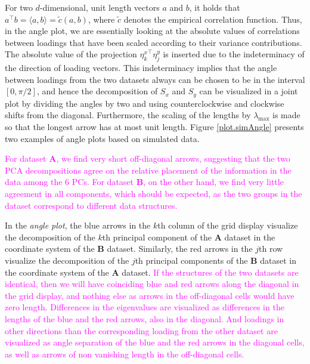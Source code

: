 \documentclass[a4paper,12pt]{article}
\newcommand{\hl}[1]{\textcolor{magenta}{#1}}
\begin{document}
For two $d$-dimensional, unit length vectors $a$ and $b$, it holds that $ a^\top b = \langle a, b \rangle = \tilde{c}(a,b)$, where $\tilde{c}$ denotes the empirical correlation function. Thus, in the angle plot, we are essentially looking at the absolute values of correlations between loadings that have been scaled according to their variance contributions. The absolute value of the projection ${\eta_{k}^x}^\top \eta_{j}^y$ is inserted due to the indeterminacy of the direction of loading vectors. This indeterminacy implies that the angle between loadings from the two datasets always can be chosen to be in the interval $[0,\pi/2]$, and hence the decomposition of $S_x$ and $S_y$ can be visualized in a joint plot by dividing the angles by two and using counterclockwise and clockwise shifts from the diagonal. Furthermore, the scaling of the lengths by $\lambda_{\max}$ is made so that the longest arrow has at most unit length. Figure \ref{plot.simAngle} presents two examples of angle plots based on simulated data.


\hl{For dataset $\mathbf{A}$, we find very short off-diagonal arrows, suggesting that the two PCA decompositions agree on the relative placement of the information in  the data among the 6 PCs.  For dataset $\mathbf{B}$, on the other hand, we find very little agreement in all components, which should be expected, as the two groups in the dataset correspond to different data structures.}

In the \emph{angle plot}, the blue arrows in the $k$th column of the grid display visualize the decomposition of the $k$th principal component of the $\mathbf{A}$ dataset in the coordinate system of the $\mathbf{B}$ dataset. Similarly, the red arrows in the $j$th row visualize the decomposition of the $j$th principal components of the $\mathbf{B}$ dataset in the coordinate system of the $\mathbf{A}$ dataset. \hl{If the structures of the two datasets are identical, then we will have coinciding blue and red arrows along the diagonal in the grid display, and nothing else as arrows in the off-diagonal cells would have zero length. Differences in the eigenvalues are visualized as differences in the lengths of the blue and the red arrows, also in the diagonal. And loadings in other directions than the corresponding loading from the other dataset are visualized as angle separation of the blue and the red arrows in the diagonal cells, as well as arrows of non vanishing length in the off-diagonal cells.}
\end{document}
